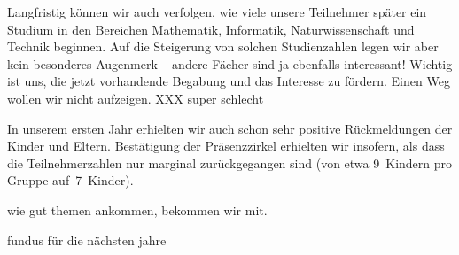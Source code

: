 \documentclass[12pt]{zettel}
\begin{document}
Langfristig können wir auch verfolgen, wie viele unsere Teilnehmer später ein
Studium in den Bereichen Mathematik, Informatik, Naturwissenschaft und Technik
beginnen. Auf die Steigerung von solchen Studienzahlen legen wir aber kein
besonderes Augenmerk -- andere Fächer sind ja ebenfalls interessant! Wichtig
ist uns, die jetzt vorhandende Begabung und das Interesse zu fördern. Einen Weg
wollen wir nicht aufzeigen. XXX super schlecht

In unserem ersten Jahr erhielten wir auch schon sehr positive Rückmeldungen der
Kinder und Eltern. Bestätigung der Präsenzzirkel erhielten wir insofern, als
dass die Teilnehmerzahlen nur marginal zurückgegangen sind (von etwa 9~Kindern
pro Gruppe auf~7~Kinder).

wie gut themen ankommen, bekommen wir mit.

fundus für die nächsten jahre
\end{document}
